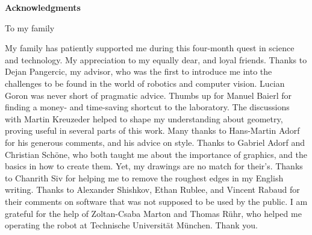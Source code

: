 \clearemptydoublepage
{}
{}	



\vspace*{2cm}

\begin{center}
{\Large \bf Acknowledgments}
\end{center}

\vspace{1cm}

\begin{center}
    To my family
\vspace{1cm}
\end{center}


\vspace{1cm}


My family has patiently supported me during this four-month quest in science and
technology. My appreciation to my equally dear, and loyal friends. Thanks to
Dejan Pangercic, my advisor, who was the first to introduce me into the
challenges to be found in the world of robotics and computer vision. Lucian
Goron was never short of pragmatic advice. Thumbs up for Manuel Baierl for
finding a money- and time-saving shortcut to the laboratory. The discussions
with Martin Kreuzeder helped to shape my understanding about geometry, proving
useful in several parts of this work.  Many thanks to Hans-Martin Adorf for his
generous comments, and his advice on style.  Thanks to Gabriel Adorf and
Christian Schöne, who both taught me about the importance of graphics, and the
basics in how to create them. Yet, my drawings are no match for their's. Thanks
to Chanrith Siv for helping me to remove the roughest edges in my English
writing.  Thanks to Alexander Shishkov, Ethan Rublee, and Vincent Rabaud for
their comments on software that was not supposed to be used by the public. I am
grateful for the help of Zoltan-Csaba Marton and Thomas Rühr, who helped me
operating the robot at Technische Universität München. Thank you.

